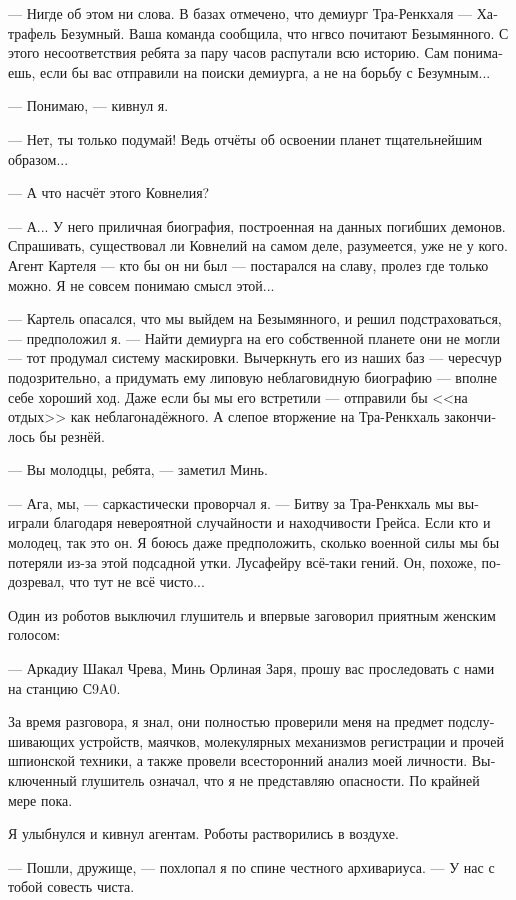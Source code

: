 \documentclass[a4paper,12pt,fleqn]{book}\usepackage{polyglossia}\setdefaultlanguage[babelshorthands=true]{russian}\setotherlanguage{english}\defaultfontfeatures{Ligatures=TeX,Mapping=tex-text}\usepackage{xcolor}\newcommand{\ml}[3]{#2}
\begin{document}
{--- Нигде об этом ни слова. В базах отмечено, что демиург Тра-Ренкхаля --- Хатрафель Безумный.
Ваша команда сообщила, что нгвсо почитают Безымянного.
С этого несоответствия ребята за пару часов распутали всю историю.
Сам понимаешь, если бы вас отправили на поиски демиурга, а не на борьбу с Безумным...

--- Понимаю, --- кивнул я.

--- Нет, ты только подумай!
Ведь отчёты об освоении планет тщательнейшим образом...

--- А что насчёт этого Ковнелия?

--- А...
У него приличная биография, построенная на данных погибших демонов.
Спрашивать, существовал ли Ковнелий на самом деле, разумеется, уже не у кого.
Агент Картеля --- кто бы он ни был --- постарался на славу, пролез где только можно.
Я не совсем понимаю смысл этой...

--- Картель опасался, что мы выйдем на Безымянного, и решил подстраховаться, --- предположил я.
--- Найти демиурга на его собственной планете они не могли --- тот продумал систему маскировки.
Вычеркнуть его из наших баз --- чересчур подозрительно, а придумать ему липовую неблаговидную биографию --- вполне себе хороший ход.
Даже если бы мы его встретили --- отправили бы <<на отдых>> как неблагонадёжного.
А слепое вторжение на Тра-Ренкхаль закончилось бы резнёй.

--- Вы молодцы, ребята, --- заметил Минь.

--- Ага, мы, --- саркастически проворчал я.
--- Битву за Тра-Ренкхаль мы выиграли благодаря невероятной случайности и находчивости Грейса.
Если кто и молодец, так это он.
Я боюсь даже предположить, сколько военной силы мы бы потеряли из-за этой подсадной утки.
Лусафейру всё-таки гений.
Он, похоже, подозревал, что тут не всё чисто...

Один из роботов выключил глушитель и впервые заговорил приятным женским голосом:

--- Аркадиу Шакал Чрева, Минь Орлиная Заря, прошу вас проследовать с нами на станцию С9A0.

За время разговора, я знал, они полностью проверили меня на предмет подслушивающих устройств, маячков, молекулярных механизмов регистрации и прочей шпионской техники, а также провели всесторонний анализ моей личности.
Выключенный глушитель означал, что я не представляю опасности.
По крайней мере пока.

Я улыбнулся и кивнул агентам.
Роботы растворились в воздухе.

--- Пошли, дружище, --- похлопал я по спине честного архивариуса.
--- У нас с тобой совесть чиста.

}
\end{document}
